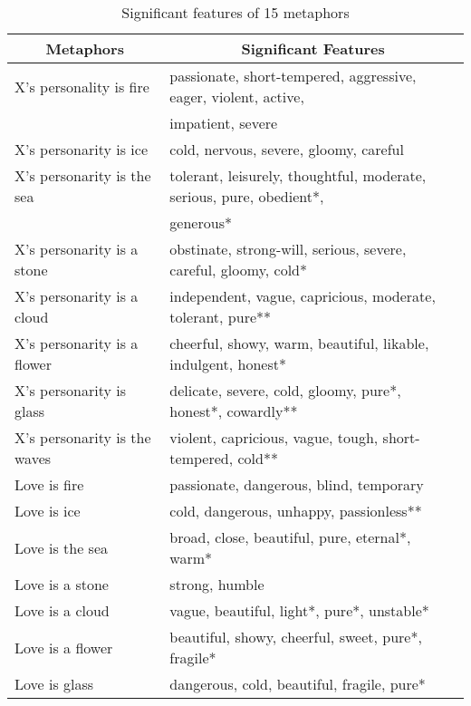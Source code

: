 \begin{table}[t]
  \caption{Significant features of 15 metaphors}\label{tbl:significance}
  \footnotesize
  \begin{tabular}{ll@{\extracolsep{\fill}}} \hline
    \multicolumn{1}{c}{Metaphors} & \multicolumn{1}{c}{Significant Features} \\
    \hline 
    X's personality is fire & passionate, short-tempered, aggressive, eager, 
    violent, active, \\
    & impatient, severe \\
    X's personarity is ice & cold, nervous, severe, gloomy, careful \\
    X's personarity is the sea & tolerant, leisurely, thoughtful, moderate, serious, pure,
    obedient*,\\ & generous* \\
    X's personarity is a stone & obstinate, strong-will, serious, severe, 
    careful, gloomy, cold* \\
    X's personarity is a cloud & independent, vague, capricious, moderate, tolerant, pure** \\
    X's personarity is a flower~~ & cheerful, showy, warm, 
    beautiful, likable, indulgent, honest* \\
    X's personarity is glass & delicate, severe, cold, gloomy, pure*, honest*, cowardly** \\
    X's personarity is the waves & violent, capricious, vague, tough, short-tempered, cold** \\
    Love is fire & passionate, dangerous, blind, temporary\\
    Love is ice & cold, dangerous, unhappy, passionless** \\
    Love is the sea & broad, close, beautiful, pure, eternal*, warm* \\
    Love is a stone & strong, humble \\
    Love is a cloud & vague, beautiful, light*, pure*, unstable* \\
    Love is a flower & beautiful, showy, cheerful, sweet, pure*, fragile* \\
    Love is glass & dangerous, cold, beautiful, fragile, pure* \\ \hline
  \end{tabular}
\end{table}

